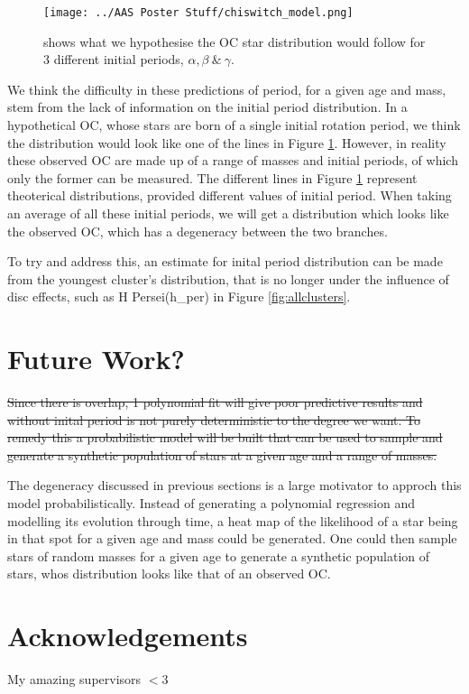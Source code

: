\documentclass[fleqn,usenatbib]{mnras}
\begin{document}
{\begin{figure}
	\texttt{[image: ../AAS Poster Stuff/chiswitch\_model.png]}
	\caption{shows what we hypothesise the OC star distribution would follow for 3 different initial periods, $\alpha, \beta~\&~\gamma$.}
	\label{fig:spread_initial_period}
\end{figure}
We think the difficulty in these predictions of period, for a given age and mass, stem from the lack of information on the initial period distribution.
In a hypothetical OC, whose stars are born of a single initial rotation period, we think the distribution would look like one of the lines in Figure \ref{fig:spread_initial_period}.
However, in reality these observed OC are made up of a range of masses and initial periods, of which only the former can be measured.
The different lines in Figure \ref{fig:spread_initial_period} represent theoterical distributions, provided different values of initial period.
When taking an average of all these initial periods, we will get a distribution which looks like the observed OC, which has a degeneracy between the two branches.

To try and address this, an estimate for inital period distribution can be made from the youngest cluster's distribution, that is no longer under the influence of disc effects, such as H Persei(h\_per) in Figure \ref{fig:allclusters}.



\section{Future Work?}
\sout{Since there is overlap, 1 polynomial fit will give poor predictive results and without inital period is not purely deterministic to the degree we want.
	To remedy this a probabilistic model will be built that can be used to sample and generate a synthetic population of stars at a given age and a range of masses.}

The degeneracy discussed in previous sections is a large motivator to approch this model probabilistically.
Instead of generating a polynomial regression and modelling its evolution through time, a heat map of the likelihood of a star being in that spot for a given age and mass could be generated.
One could then sample stars of random masses for a given age to generate a synthetic population of stars, whos distribution looks like that of an observed OC.
\section*{Acknowledgements}
My amazing supervisors $<3$

}
\end{document}
